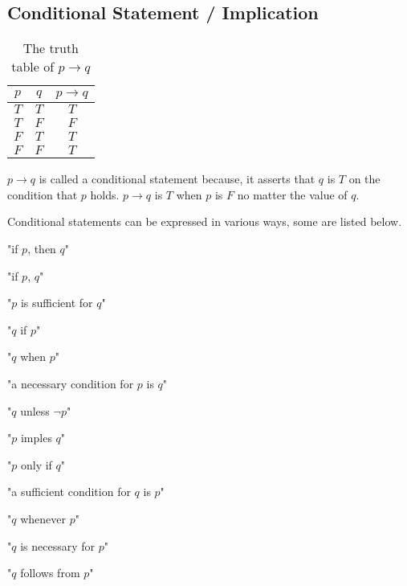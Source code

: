 \documentclass[12pt letter]{report}
\begin{document}
\subsection{Conditional Statement / Implication}


\begin{table}[h!]
	\caption{The truth table of $p \to  q$}\label{tab:5}
	\begin{center}
		\begin{tabular}{|c c|c|}
			\hline
			$p$ & $q$ & $p \to q$ \\[0.5ex]
			\hline
			\hline
			$T$ & $T$ & $T$       \\
			$T$ & $F$ & $F$       \\
			$F$ & $T$ & $T$       \\
			$F$ & $F$ & $T$       \\
			\hline
		\end{tabular}
	\end{center}
\end{table}

$p \to q$ is called a conditional statement because, it asserts that $q$ is $T$ on the condition that $p$ holds.
$p \to q$ is $T$ when $p$ is $F$ no matter the value of $q$.

Conditional statements can be expressed in various ways, some are listed below.

"if $p$, then $q$"

"if $p$, $q$"

"$p$ is sufficient for $q$"

"$q$ if $p$"

"$q$ when $p$"

"a necessary condition for $p$ is $q$"

"$q$ unless $\neg p$"


"$p$ imples $q$"

"$p$ only if $q$"

"a sufficient condition for $q$ is $p$"

"$q$ whenever $p$"

"$q$ is necessary for $p$"

"$q$ follows from $p$"
\end{document}
